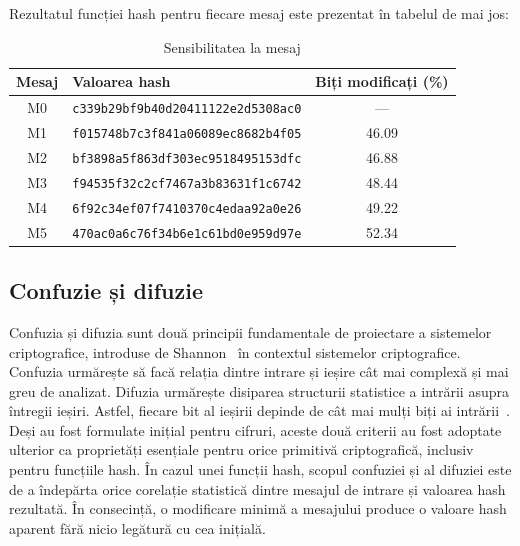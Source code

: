 \newpage

Rezultatul funcției hash pentru fiecare mesaj este prezentat în tabelul de mai jos:

\begin{table}[!htbp]
    \centering
    \begin{tabular}{|c|l|c|}
        \hline
        \textbf{Mesaj} & \textbf{Valoarea hash} & \textbf{Biți modificați (\%)} \\
        \hline
        M0 & \texttt{c339b29bf9b40d20411122e2d5308ac0} & --- \\
        \hline
        M1 & \texttt{f015748b7c3f841a06089ec8682b4f05} & 46.09 \\
        \hline
        M2 & \texttt{bf3898a5f863df303ec9518495153dfc} & 46.88 \\
        \hline
        M3 & \texttt{f94535f32c2cf7467a3b83631f1c6742} & 48.44 \\
        \hline
        M4 & \texttt{6f92c34ef07f7410370c4edaa92a0e26} & 49.22 \\
        \hline
        M5 & \texttt{470ac0a6c76f34b6e1c61bd0e959d97e} & 52.34 \\
        \hline
    \end{tabular}
    \caption{Sensibilitatea la mesaj}
    \label{tab:sensibilitate}
\end{table}

\subsection{Confuzie și difuzie}
Confuzia și difuzia sunt două principii fundamentale de proiectare a sistemelor criptografice, introduse de Shannon~\cite{shannon1949} în contextul sistemelor criptografice.
Confuzia urmărește să facă relația dintre intrare și ieșire cât mai complexă și mai greu de analizat.
Difuzia urmărește disiparea structurii statistice a intrării asupra întregii ieșiri.
Astfel, fiecare bit al ieșirii depinde de cât mai mulți biți ai intrării~\cite{shannon1949}.
Deși au fost formulate inițial pentru cifruri, aceste două criterii au fost adoptate ulterior ca proprietăți esențiale pentru orice primitivă criptografică, inclusiv pentru funcțiile hash.
În cazul unei funcții hash, scopul confuziei și al difuziei este de a îndepărta orice corelație statistică dintre mesajul de intrare și valoarea hash rezultată.
În consecință, o modificare minimă a mesajului produce o valoare hash aparent fără nicio legătură cu cea inițială. \\


